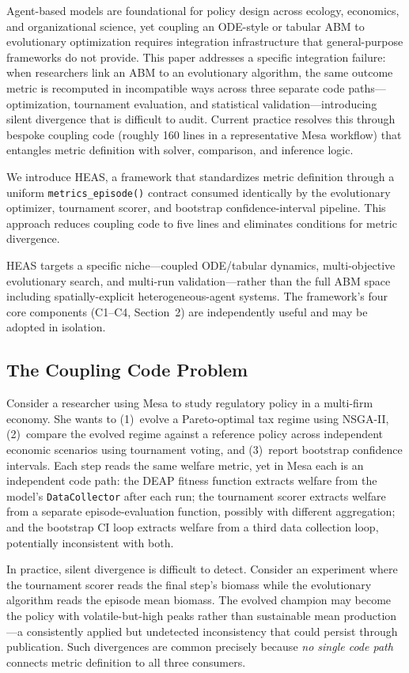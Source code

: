 \documentclass{wscpaperproc}
\begin{document}
Agent-based models are foundational for policy design across ecology,
economics, and organizational science, yet coupling an ODE-style or tabular ABM
to evolutionary optimization requires integration infrastructure that
general-purpose frameworks do not provide. This paper addresses a specific
integration failure: when researchers link an ABM to an evolutionary algorithm,
the same outcome metric is recomputed in incompatible ways across three separate
code paths---optimization, tournament evaluation, and statistical
validation---introducing silent divergence that is difficult to audit. Current
practice resolves this through bespoke coupling code (roughly 160 lines in a
representative Mesa workflow) that entangles metric definition with solver,
comparison, and inference logic.

We introduce HEAS, a framework that standardizes metric definition through a
uniform \texttt{metrics\_episode()} contract consumed identically by the
evolutionary optimizer, tournament scorer, and bootstrap confidence-interval
pipeline. This approach reduces coupling code to five lines and eliminates
conditions for metric divergence.

HEAS targets a specific niche---coupled ODE/tabular dynamics, multi-objective
evolutionary search, and multi-run validation---rather than the full ABM space
including spatially-explicit heterogeneous-agent systems. The framework's four
core components (C1--C4, Section~2) are independently useful and may be adopted
in isolation.

\subsection{The Coupling Code Problem}

Consider a researcher using Mesa to study regulatory policy in a multi-firm
economy. She wants to (1)~evolve a Pareto-optimal tax regime using NSGA-II,
(2)~compare the evolved regime against a reference policy across independent
economic scenarios using tournament voting, and (3)~report bootstrap confidence
intervals. Each step reads the same welfare metric, yet in Mesa each is an
independent code path: the DEAP fitness function extracts welfare from the
model's \texttt{DataCollector} after each run; the tournament scorer extracts
welfare from a separate episode-evaluation function, possibly with different
aggregation; and the bootstrap CI loop extracts welfare from a third data
collection loop, potentially inconsistent with both.

In practice, silent divergence is difficult to detect. Consider an experiment
where the tournament scorer reads the final step's biomass while the
evolutionary algorithm reads the episode mean biomass. The evolved champion may
become the policy with volatile-but-high peaks rather than sustainable mean
production---a consistently applied but undetected inconsistency that could
persist through publication. Such divergences are common precisely because
\emph{no single code path} connects metric definition to all three consumers.
\end{document}

